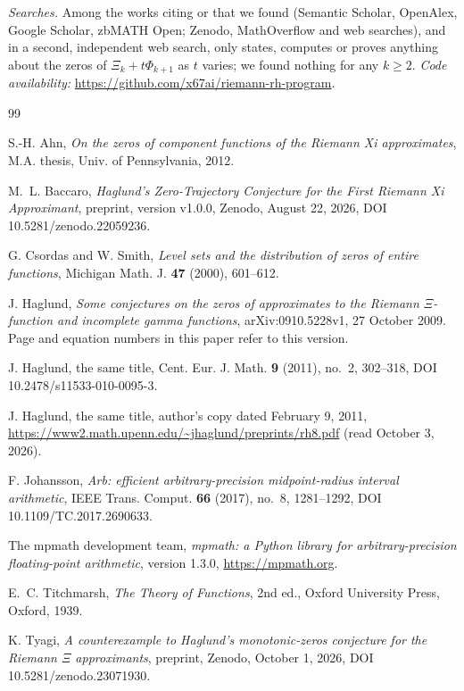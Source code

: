 \documentclass[11pt]{article}
\theoremstyle{plain}
\theoremstyle{definition}
\theoremstyle{remark}
\begin{document}
\emph{Searches.} Among the works citing \cite{Hag} or \cite{HagJ} that we
found (Semantic Scholar, OpenAlex, Google Scholar, zbMATH Open; Zenodo,
MathOverflow and web searches), and in a second, independent web search, only
\cite{Bac} states, computes or proves anything about the zeros of
$\Xi_k + t\Phi_{k+1}$ as $t$ varies; we found nothing for any $k \ge 2$.
\emph{Code availability:} \url{https://github.com/x67ai/riemann-rh-program}.

{\small
\begin{thebibliography}{99}
\setlength{\itemsep}{0pt}

 S.-H. Ahn, \emph{On the zeros of component functions of
the Riemann Xi approximates}, M.A. thesis, Univ. of Pennsylvania, 2012.

 M.~L. Baccaro, \emph{Haglund's Zero-Trajectory Conjecture
for the First Riemann Xi Approximant}, preprint, version v1.0.0, Zenodo,
August 22, 2026, DOI 10.5281/zenodo.22059236.

 G. Csordas and W. Smith, \emph{Level sets and the
distribution of zeros of entire functions}, Michigan Math. J. \textbf{47}
(2000), 601--612.

 J. Haglund, \emph{Some conjectures on the zeros of
approximates to the Riemann $\Xi$-function and incomplete gamma functions},
arXiv:0910.5228v1, 27 October 2009. Page and equation numbers in this paper
refer to this version.

 J. Haglund, the same title, Cent. Eur. J. Math. \textbf{9} (2011), no.~2, 302--318,
DOI 10.2478/s11533-010-0095-3.

 J. Haglund, the same title, author's copy dated
February 9, 2011,
\url{https://www2.math.upenn.edu/~jhaglund/preprints/rh8.pdf} (read October 3,
2026).

 F. Johansson, \emph{Arb: efficient arbitrary-precision
midpoint-radius interval arithmetic}, IEEE Trans. Comput. \textbf{66} (2017),
no.~8, 1281--1292, DOI 10.1109/TC.2017.2690633.

 The mpmath development team, \emph{mpmath: a Python
library for arbitrary-precision floating-point arithmetic}, version 1.3.0,
\url{https://mpmath.org}.

 E.~C. Titchmarsh, \emph{The Theory of Functions}, 2nd ed.,
Oxford University Press, Oxford, 1939.

 K. Tyagi, \emph{A counterexample to Haglund's
monotonic-zeros conjecture for the Riemann $\Xi$ approximants}, preprint,
Zenodo, October 1, 2026, DOI 10.5281/zenodo.23071930.

\end{thebibliography}
}
\end{document}
